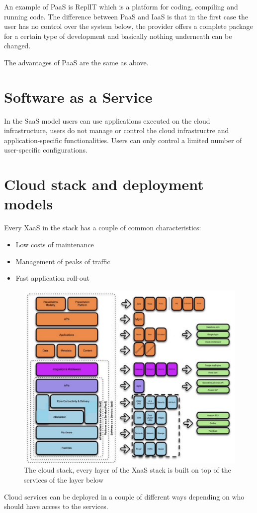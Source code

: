 An example of PaaS is ReplIT which is a platform for coding, compiling and running code. The difference between PaaS and IaaS is that in the first case the user has no control over the system below, the provider offers a complete package for a certain type of development and basically nothing underneath can be changed.

The advantages of PaaS are the same as above.

\section{Software as a Service}
In the SaaS model users can use applications executed on the cloud infrastructure, users do not manage or control the cloud infrastructre and application-specific functionalities. Users can only control a limited number of user-specific configurations.

\section{Cloud stack and deployment models}
Every XaaS in the stack has a couple of common characteristics:
\begin{itemize}
    \item Low costs of maintenance
    \item Management of peaks of traffic
    \item Fast application roll-out
\end{itemize}
\begin{figure}
    \centering
    \includegraphics[scale=0.2]{img/cloud_stack.jpeg}
    \caption{The cloud stack, every layer of the XaaS stack is built on top of the services of the layer below}
\end{figure}
Cloud services can be deployed in a couple of different ways depending on who should have access to the services.

